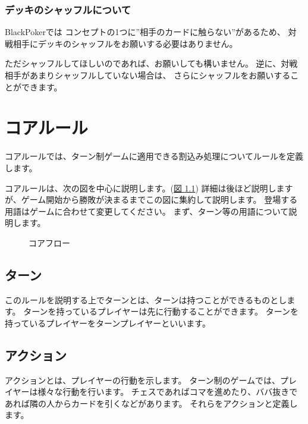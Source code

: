 \documentclass[letterpaper,10pt,dvipdfmx]{sphinxmanual}
\begin{document}
\subsection{デッキのシャッフルについて}
\label{\detokenize{common/07-etc:id3}}
BlackPokerでは
コンセプトの1つに”相手のカードに触らない”があるため、
対戦相手にデッキのシャッフルをお願いする必要はありません。

ただシャッフルしてほしいのであれば、お願いしても構いません。
逆に、対戦相手があまりシャッフルしていない場合は、
さらにシャッフルをお願いすることができます。


\chapter{コアルール}
\label{\detokenize{core/core:id1}}\label{\detokenize{core/core::doc}}
コアルールでは、ターン制ゲームに適用できる割込み処理についてルールを定義します。

コアルールは、次の図を中心に説明します。(\hyperref[\detokenize{core/core:coreflow-1}]{図 \ref{\detokenize{core/core:coreflow-1}}})
詳細は後ほど説明しますが、ゲーム開始から勝敗が決まるまでこの図に集約して説明します。
登場する用語はゲームに合わせて変更してください。
まず、ターン等の用語について説明します。

\begin{figure}[htbp]
\centering
\capstart

\noindent{}
\caption{コアフロー}\label{\detokenize{core/core:id16}}\label{\detokenize{core/core:coreflow-1}}\end{figure}


\section{ターン}
\label{\detokenize{core/core:id2}}
このルールを説明する上でターンとは、ターンは持つことができるものとします。
ターンを持っているプレイヤーは先に行動することができます。
ターンを持っているプレイヤーをターンプレイヤーといいます。


\section{アクション}
\label{\detokenize{core/core:id3}}
アクションとは、プレイヤーの行動を示します。
ターン制のゲームでは、プレイヤーは様々な行動を行います。
チェスであればコマを進めたり、ババ抜きであれば隣の人からカードを引くなどがあります。
それらをアクションと定義します。
\end{document}
